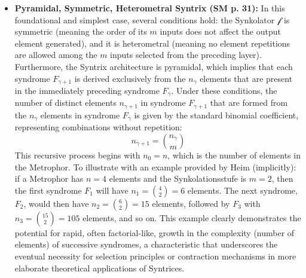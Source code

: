 \documentclass[12pt]{article}
\newcommand{\synkolator}{\mathcal{f}}
\newcommand{\synkolationsstufe}{m}
\newcommand{\syndrom}{F} %
\begin{document}
\begin{itemize}
    \item \textbf{Pyramidal, Symmetric, Heterometral Syntrix (SM p. 31):}
    In this foundational and simplest case, several conditions hold: the Synkolator \( \synkolator \) is symmetric (meaning the order of its \( \synkolationsstufe \) inputs does not affect the output element generated), and it is heterometral (meaning no element repetitions are allowed among the \( \synkolationsstufe \) inputs selected from the preceding layer). Furthermore, the Syntrix architecture is pyramidal, which implies that each syndrome \( \syndrom_{\gamma+1} \) is derived exclusively from the \( n_\gamma \) elements that are present in the immediately preceding syndrome \( \syndrom_\gamma \). Under these conditions, the number of distinct elements \( n_{\gamma+1} \) in syndrome \( \syndrom_{\gamma+1} \) that are formed from the \( n_\gamma \) elements in syndrome \( \syndrom_\gamma \) is given by the standard binomial coefficient, representing combinations without repetition:
    \begin{equation*}
    n_{\gamma+1} = \binom{n_\gamma}{\synkolationsstufe}
    \end{equation*}
    This recursive process begins with \( n_0 = n \), which is the number of elements in the Metrophor. To illustrate with an example provided by Heim (implicitly): if a Metrophor has \( n=4 \) elements and the Synkolationsstufe is \( \synkolationsstufe=2 \), then the first syndrome \( \syndrom_1 \) will have \( n_1 = \binom{4}{2}=6 \) elements. The next syndrome, \( \syndrom_2 \), would then have \( n_2 = \binom{6}{2}=15 \) elements, followed by \( \syndrom_3 \) with \( n_3 = \binom{15}{2}=105 \) elements, and so on. This example clearly demonstrates the potential for rapid, often factorial-like, growth in the complexity (number of elements) of successive syndromes, a characteristic that underscores the eventual necessity for selection principles or contraction mechanisms in more elaborate theoretical applications of Syntrices.


\end{itemize}
\end{document}
